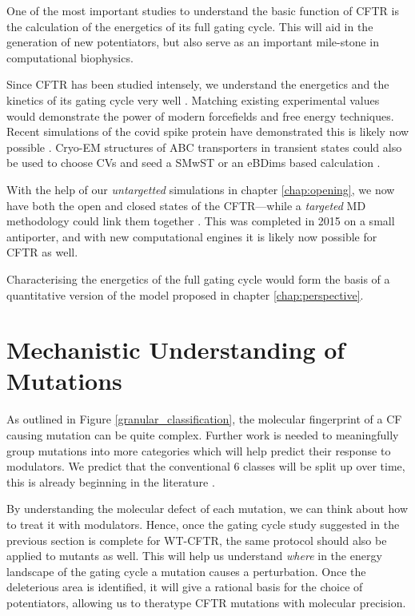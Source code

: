 One of the most important studies to understand the basic function of CFTR is the calculation of the energetics of its full gating cycle. This will aid in the generation of new potentiators, but also serve as an important mile-stone in computational biophysics.

Since CFTR has been studied intensely, we understand the energetics and the kinetics of its gating cycle very well \cite{csanady2017}. Matching existing experimental values would demonstrate the power of modern forcefields and free energy techniques. Recent simulations of the covid spike protein have demonstrated this is likely now possible \cite{casalino2021}. Cryo-EM structures of ABC transporters in transient states could also be used to choose CVs and seed a SMwST or an eBDims based calculation \cite{hofmann2019, orellana2016, roux2021, pan2008}. 

With the help of our \textit{untargetted} simulations in chapter \ref{chap:opening}, we now have both the open and closed states of the CFTR---while a \textit{targeted} MD methodology could link them together \cite{zhang2018, liu2017}. This was completed in 2015 on a small antiporter, and with new computational engines it is likely now possible for CFTR as well\cite{moradi2015}.

Characterising the energetics of the full gating cycle would form the basis of a quantitative version of the model proposed in chapter \ref{chap:perspective}.

\section{Mechanistic Understanding of Mutations}
As outlined in Figure \ref{granular_classification}, the molecular fingerprint of a CF causing mutation can be quite complex. Further work is needed to meaningfully group mutations into more categories which will help predict their response to modulators. We predict that the conventional 6 classes will be split up over time, this is already beginning in the literature \cite{veit2016}. 

By understanding the molecular defect of each mutation, we can think about how to treat it with modulators. Hence, once the gating cycle study suggested in the previous section is complete for WT-CFTR, the same protocol should also be applied to mutants as well. This will help us understand \textit{where} in the energy landscape of the gating cycle a mutation causes a perturbation. Once the deleterious area is identified, it will give a rational basis for the choice of potentiators, allowing us to theratype CFTR mutations with molecular precision.

